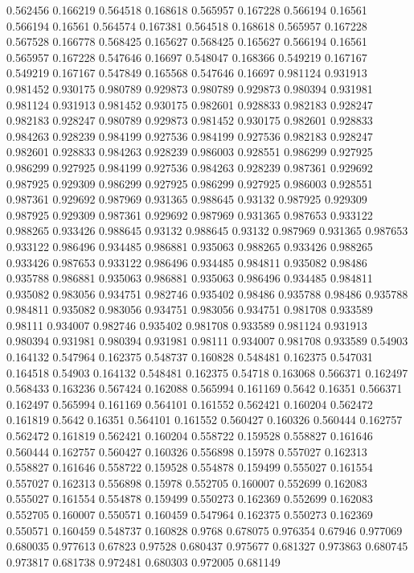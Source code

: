 0.562456 0.166219
0.564518 0.168618
0.565957 0.167228
0.566194 0.16561
0.566194 0.16561
0.564574 0.167381
0.564518 0.168618
0.565957 0.167228
0.567528 0.166778
0.568425 0.165627
0.568425 0.165627
0.566194 0.16561
0.565957 0.167228
0.547646 0.16697
0.548047 0.168366
0.549219 0.167167
0.549219 0.167167
0.547849 0.165568
0.547646 0.16697
0.981124 0.931913
0.981452 0.930175
0.980789 0.929873
0.980789 0.929873
0.980394 0.931981
0.981124 0.931913
0.981452 0.930175
0.982601 0.928833
0.982183 0.928247
0.982183 0.928247
0.980789 0.929873
0.981452 0.930175
0.982601 0.928833
0.984263 0.928239
0.984199 0.927536
0.984199 0.927536
0.982183 0.928247
0.982601 0.928833
0.984263 0.928239
0.986003 0.928551
0.986299 0.927925
0.986299 0.927925
0.984199 0.927536
0.984263 0.928239
0.987361 0.929692
0.987925 0.929309
0.986299 0.927925
0.986299 0.927925
0.986003 0.928551
0.987361 0.929692
0.987969 0.931365
0.988645 0.93132
0.987925 0.929309
0.987925 0.929309
0.987361 0.929692
0.987969 0.931365
0.987653 0.933122
0.988265 0.933426
0.988645 0.93132
0.988645 0.93132
0.987969 0.931365
0.987653 0.933122
0.986496 0.934485
0.986881 0.935063
0.988265 0.933426
0.988265 0.933426
0.987653 0.933122
0.986496 0.934485
0.984811 0.935082
0.98486 0.935788
0.986881 0.935063
0.986881 0.935063
0.986496 0.934485
0.984811 0.935082
0.983056 0.934751
0.982746 0.935402
0.98486 0.935788
0.98486 0.935788
0.984811 0.935082
0.983056 0.934751
0.983056 0.934751
0.981708 0.933589
0.98111 0.934007
0.982746 0.935402
0.981708 0.933589
0.981124 0.931913
0.980394 0.931981
0.980394 0.931981
0.98111 0.934007
0.981708 0.933589
0.54903 0.164132
0.547964 0.162375
0.548737 0.160828
0.548481 0.162375
0.547031 0.164518
0.54903 0.164132
0.548481 0.162375
0.54718 0.163068
0.566371 0.162497
0.568433 0.163236
0.567424 0.162088
0.565994 0.161169
0.5642 0.16351
0.566371 0.162497
0.565994 0.161169
0.564101 0.161552
0.562421 0.160204
0.562472 0.161819
0.5642 0.16351
0.564101 0.161552
0.560427 0.160326
0.560444 0.162757
0.562472 0.161819
0.562421 0.160204
0.558722 0.159528
0.558827 0.161646
0.560444 0.162757
0.560427 0.160326
0.556898 0.15978
0.557027 0.162313
0.558827 0.161646
0.558722 0.159528
0.554878 0.159499
0.555027 0.161554
0.557027 0.162313
0.556898 0.15978
0.552705 0.160007
0.552699 0.162083
0.555027 0.161554
0.554878 0.159499
0.550273 0.162369
0.552699 0.162083
0.552705 0.160007
0.550571 0.160459
0.547964 0.162375
0.550273 0.162369
0.550571 0.160459
0.548737 0.160828
0.9768 0.678075
0.976354 0.67946
0.977069 0.680035
0.977613 0.67823
0.97528 0.680437
0.975677 0.681327
0.973863 0.680745
0.973817 0.681738
0.972481 0.680303
0.972005 0.681149
